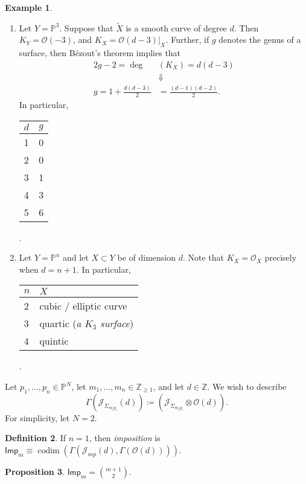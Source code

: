 \documentclass[10pt,letterpaper,cm]{nupset}
\theoremstyle{definition}
\newtheorem{defn}{Definition}[subsection]
\newtheorem{exmp}[defn]{Example}
\theoremstyle{theorem}
\newtheorem{prop}[defn]{Proposition}
\theoremstyle{remark}
\newcommand{\J}{\mathcal J}
\renewcommand{\O}{\mathcal O}
\renewcommand{\P}{\mathbb P}
\newcommand{\Z}{\mathbb Z}
\newcommand{\imp}{\mathsf{Imp}}
\newcommand{\1}{\mathbb{1}}
\newcommand{\0}{\vec 0}
\DeclareMathOperator{\codim}{codim}
\newcommand{\be}{\begin{enumerate}}
\newcommand{\ee}{\end{enumerate}}
\begin{document}
\begin{exmp} $ $
\be
\item Let $Y = \P^3$. Suppose that $\widetilde{X}$ is a smooth curve of degree $d$. Then $K_Y = \O\left({-3}\right)$, and  $K_X = \O\left(d-3\right)\bigr\rvert_X$. Further, if $g$ denotes the genus of a surface, then B\'ezout's theorem implies that
\begin{align*}
2g-2  = \deg & \left( K_X\right) =d\left(d-3\right)
\\ &  \Downarrow
\\ g  = 1+ \frac{d\left(d-3\right)}{2}&= \frac{\left(d-1\right)\left(d-2\right)}{2}.
\end{align*}
In particular,
\begin{table}[H]
\centering
\begin{tabular}{l|l}
$d$ & $g$ \\ \hline
1 & 0 \\
2 & 0 \\
3 & 1 \\
4 & 3 \\
5 & 6
\end{tabular}
.\end{table}
\item Let $Y = \P^n$ and let $X\subset Y$ be of dimension $d$. Note that $K_X = \O_X$ precisely when $d= n+1$. In particular,
\begin{table}[H]
\centering
\begin{tabular}{l|l}
$n$ & $X$ \\ \hline
2 & cubic / elliptic curve \\
3 & quartic (\textit{a $K_3$ surface}) \\
4 & quintic
\end{tabular}
.\end{table}
\ee
\end{exmp}

\smallskip

Let $p_1, \ldots, p_n \in \P^N$,  let $m_1, \ldots, m_n \in \Z_{\geq 1}$, and let $d\in \Z$. We wish to describe $$\Gamma \left(\J_{\Sigma_{m_ip_i}}\left(d\right)\right) \coloneqq \left(\J_{\Sigma_{m_ip_i}} \otimes \O(d) \right).$$ For simplicity, let $N=2$.

\begin{defn}
If $n=1$, then \textit{imposition} is $\imp_m \equiv \codim\left(\Gamma\left(\J_{mp}(d), \Gamma\left(\O(d)\right)\right)\right)$.
\end{defn}

\begin{prop}
$\imp_m = {{m+1} \choose 2}$. 
\end{prop}
\end{document}
